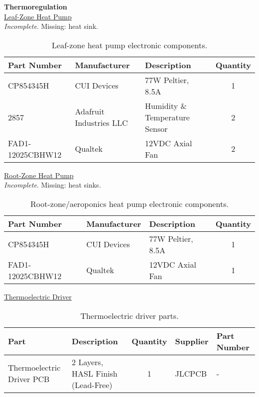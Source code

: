 \clearpage

\textbf{Thermoregulation}\\
\uline{Leaf-Zone Heat Pump}\\
\textit{Incomplete}. Missing: heat sink.
\begin{table}[!ht]
    \centering
    \begin{tabular}{|l|l|l|c|}
    \hline
        Part Number         & Manufacturer              & Description                       & Quantity  \\ \hline
        CP854345H           & CUI Devices               & 77W Peltier, 8.5A                 & 1         \\ \hline
        2857                & Adafruit Industries LLC   & Humidity \& Temperature Sensor    & 2         \\ \hline
        FAD1-12025CBHW12    & Qualtek                   & 12VDC Axial Fan                   & 2         \\ \hline
    \end{tabular}
    \caption{Leaf-zone heat pump electronic components.}
    \label{tab:thermoregulation_leafzone_components}
\end{table}

\uline{Root-Zone Heat Pump}\\
\textit{Incomplete}. Missing: heat sinks.
\begin{table}[!ht]
    \centering
    \begin{tabular}{|l|l|l|c|}
    \hline
        Part Number         & Manufacturer              & Description                       & Quantity  \\ \hline
        CP854345H           & CUI Devices               & 77W Peltier, 8.5A                 & 1         \\ \hline
        FAD1-12025CBHW12    & Qualtek                   & 12VDC Axial Fan                   & 1         \\ \hline
    \end{tabular}
    \caption{Root-zone/aeroponics heat pump electronic components.}
    \label{tab:thermoregulation_rootzone_components}
\end{table}

\clearpage

\uline{Thermoelectric Driver}
\begin{table}[!ht]
    \centering
    \begin{tabular}{|l|l|c|l|l|}
    \hline
        Part                        & Description                       & Quantity  & Supplier  & Part Number  \\ \hline
        Thermoelectric Driver PCB   & 2 Layers, HASL Finish (Lead-Free) & 1         & JLCPCB    & -                     \\ \hline
    \end{tabular}
    \caption{Thermoelectric driver parts.}
    \label{tab:automation_parts}
\end{table}

